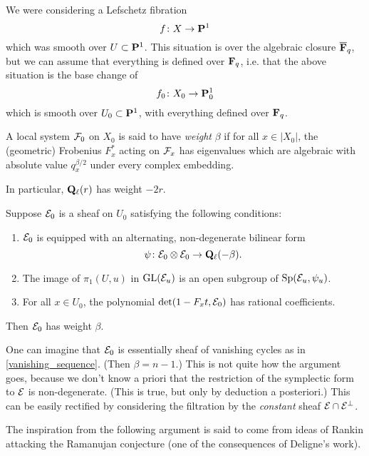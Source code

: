  We were considering a Lefschetz fibration 
 \[
f \colon  X \rightarrow \mathbf{P}^1
 \]
 which was smooth over $U \subset \mathbf{P}^1$. This situation is over the algebraic closure $\overline{\mathbf{F}}_q$, but we can assume that everything is defined over $\mathbf{F}_q$, i.e. that the above situation is the base change of 
 \[
 f_0 \colon X_0 \rightarrow \mathbf{P}_0^1
 \]
which is smooth over $U_0 \subset \mathbf{P}^1$, with everything defined over $\mathbf{F}_q$. 
 
\begin{defn} A local system $\mathcal{F}_0$ on $X_0$ is said to have \emph{weight} $\beta$ if for all $x \in |X_0|$, the (geometric) Frobenius $F_x^*$ acting on $\mathcal{F}_x$ has eigenvalues which are algebraic with absolute value $q_x^{\beta/2}$ under every complex embedding.
\end{defn}

\begin{ex}
 In particular, $\mathbf{Q}_{\ell}(r)$ has weight $-2r$. 
 \end{ex}
 

\begin{thm}\label{fundamental}
Suppose $\mathcal{E}_0$ is a sheaf on $U_0$ satisfying the following conditions:
\begin{enumerate}
\item $\mathcal{E}_0$ is equipped with an alternating, non-degenerate bilinear form 
\[
\psi \colon \mathcal{E}_0 \otimes \mathcal{E}_0 \rightarrow \mathbf{Q}_{\ell}(-\beta).
\] 
\item The image of $\pi_1(U, u)$ in $\operatorname{GL}(\mathcal{E}_u)$ is an open subgroup of $\operatorname{Sp}(\mathcal{E}_u, \psi_u)$.
\item For all $x \in U_0$, the polynomial $\det (1-F_x t, \mathcal{E}_0)$ has rational coefficients. 
\end{enumerate}
Then $\mathcal{E}_0$ has weight $\beta$. 
\end{thm}

\begin{rem}
One can imagine that $\mathcal{E}_0$ is essentially sheaf of vanishing cycles as in \eqref{vanishing_sequence}. (Then $\beta=n-1$.) This is not quite how the argument goes, because we don't know a priori that the restriction of the symplectic form to $\mathcal{E}$ is non-degenerate. (This is true, but only by deduction a posteriori.) This can be easily rectified by considering the filtration by the \emph{constant} sheaf $\mathcal{E} \cap \mathcal{E}^{\perp}$. 
\end{rem}

The inspiration from the following argument is said to come from ideas of Rankin attacking the Ramanujan conjecture (one of the consequences of Deligne's work). 

